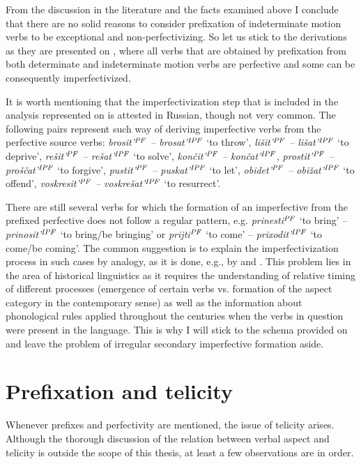 From the discussion in the literature and the facts examined above I conclude that there are no solid reasons to consider prefixation of indeterminate motion verbs to be exceptional and non-perfectivizing. So let us stick to the derivations as they are presented on , where all verbs that are obtained by prefixation from both determinate and indeterminate motion verbs are perfective and some can be consequently imperfectivized.

It is worth mentioning that the imperfectivization step that is included in the analysis represented on  is attested in Russian, though not very common. The following pairs represent such way of deriving imperfective verbs from the perfective source verbs: \textit{brosit'$^{{\mathit{PF}}}$ -- brosat'$^{{\mathit{IPF}}}$} `to throw', \textit{li\v{s}it'$^{{\mathit{PF}}}$ -- li\v{s}at'$^{{\mathit{IPF}}}$} `to deprive', \textit{re\v{s}it'$^{{\mathit{PF}}}$ -- re\v{s}at'$^{{\mathit{IPF}}}$} `to solve', \textit{kon\v{c}it'$^{{\mathit{PF}}}$ -- kon\v{c}at'$^{{\mathit{IPF}}}$}, \textit{prostit'$^{{\mathit{PF}}}$ -- pro\v{s}\v{c}at'$^{{\mathit{IPF}}}$} `to forgive', \textit{pustit'$^{{\mathit{PF}}}$ -- puskat'$^{{\mathit{IPF}}}$} `to let', \textit{obidet'$^{{\mathit{PF}}}$ -- obi\v{z}at'$^{{\mathit{IPF}}}$} `to offend', \textit{voskresit'$^{{\mathit{PF}}}$ -- voskre\v{s}at'$^{{\mathit{IPF}}}$} `to resurrect'.

There are still several verbs for which the formation of an imperfective from the prefixed perfective does not follow a regular pattern, e.g. \textit{prinesti}$^{{\mathit{PF}}}$ `to bring' -- \textit{prinosit'}$^{{\mathit{IPF}}}$ `to bring/be bringing' or \textit{prijti}$^{{\mathit{PF}}}$ `to come' -- \textit{prixodit'}$^{{\mathit{IPF}}}$ `to come/be coming'. The common suggestion is to explain the imperfectivization process in such cases by analogy, as it is done, e.g., by \citet{Regnell:44} and \citet[589]{Shvedova:82}. This problem lies in the area of historical linguistics as it requires the understanding of relative timing of different processes (emergence of certain verbs vs. formation of the aspect category in the contemporary sense) as well as the information about phonological rules applied throughout the centuries when the verbs in question were present in the language. This is why I will stick to the schema provided on  and leave the problem of irregular secondary imperfective formation aside.

\section{Prefixation and telicity}\label{section:new:telicity}
Whenever prefixes and perfectivity are mentioned, the issue of telicity arises. Although the thorough discussion of the relation between verbal aspect and telicity is outside the scope of this thesis, at least a few observations are in order. %

